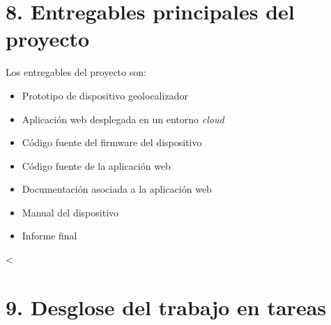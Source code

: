 \documentclass[
11pt, %
]{charter}
\begin{document}
\section{8. Entregables principales del proyecto}
\label{sec:entregables}


Los entregables del proyecto son:

\begin{itemize}
	\item Prototipo de dispositivo geolocalizador
	\item Aplicación web desplegada en un entorno \textit{cloud}
	\item Código fuente del firmware del dispositivo
	\item Código fuente de la aplicación web
	\item Documentación asociada a la aplicación web
	\item Manual del dispositivo
	\item Informe final
\end{itemize}


<\section{9. Desglose del trabajo en tareas}
\label{sec:wbs}
\end{document}
